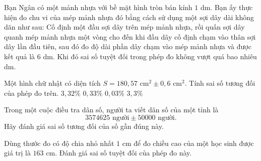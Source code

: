 \begin{bt}%
	Bạn Ngân có một mảnh nhựa với bề mặt hình tròn bán kính $1$ dm. Bạn ấy thực hiện đo chu vi của mép mảnh nhựa đó bằng cách sử dụng một sợi dây dài không dãn như sau: Cố định một đầu sợi dây trên mép  mảnh nhựa, rồi quấn sợi dây quanh mép mảnh nhựa một vòng cho đến khi đầu dây cố định chạm vào thân sợi dây lần đầu tiên, sau đó đo độ dài phần dây chạm vào mép mảnh nhựa và được kết quả là $6$ dm. Khi đó sai số tuyệt đối trong phép đo không vượt quá bao nhiêu dm.
\end{bt}

\begin{ex}%
	Một hình chữ nhật có diện tích $S=180,57 \text{ cm}^2 \pm 0,6 \text{ cm}^2$. Tính sai số tương đối của phép đo trên.
	\choice
	{$3,32\%$}
	{\True $0,33\%$}
	{$0,03\%$}
	{$3,3\%$}
\end{ex}

\begin{bt}[N]%
	Trong một cuộc điều tra dân số, người ta viết dân số của một tỉnh là $$ 3574625 \text{ người}\pm50000\text{ người}. $$
	Hãy đánh giá sai số tương đối của số gần đúng này.
\end{bt}

\begin{bt}[H]%
	Dùng thước đo có độ chia nhỏ nhất $1$ cm để đo chiều cao của một học sinh được giá trị là $163$ cm.
	Đánh giá sai số tuyệt đối của phép đo này.
\end{bt}

